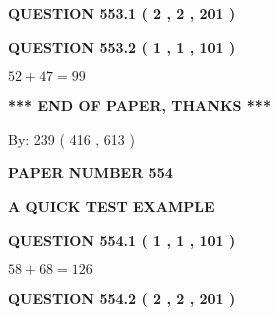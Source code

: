 \documentclass[12pt]{article}
\begin{document}
   
  
\vspace{0.2in}
  
{\textbf{\Large{QUESTION
553.1 
 ( 2 , 2 , 201 )
}}}
  
  
  
\vspace{0.2in}
  
{\textbf{\Large{QUESTION
553.2 
 ( 1 , 1 , 101 )
}}}
  
  
 
 

$ %
52 +  %
47=   %
99$
 
 
   
   
 \vspace{0.2in}
 
   
   
   
   
\vspace{1.0in} 
{\textbf{\large{ *** END OF PAPER, THANKS *** }}} 
   
   
\hspace{1.0in} By: 
 239 ( 416 ,  613 )
   
   
   
   
\newpage 
\setcounter{page}{ 
   554001 } 
   
   
   
   
 {\textbf{ \Large{ PAPER NUMBER  554  }}}
   
   
\vspace{0.2in}
   
   
   
   
   
   
 \vspace{0.2in}
{\LARGE {\textbf{ A QUICK TEST EXAMPLE}}}
   
   
  
\vspace{0.2in}
  
{\textbf{\Large{QUESTION
554.1 
 ( 1 , 1 , 101 )
}}}
  
  
 
 

$ %
58 +  %
68=   %
126$
 
 
  
\vspace{0.2in}
  
{\textbf{\Large{QUESTION
554.2 
 ( 2 , 2 , 201 )
}}}
  
  
   
\end{document}

